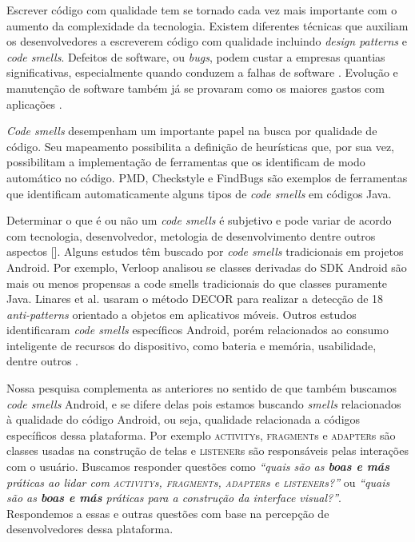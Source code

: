 Escrever c\'odigo com qualidade tem se tornado cada vez mais importante com o aumento da complexidade da tecnologia. Existem diferentes t\'ecnicas que auxiliam os desenvolvedores a escreverem c\'odigo com qualidade incluindo \textit{design patterns} e \textit{code smells}. Defeitos de software, ou \textit{bugs}, podem custar a empresas quantias significativas, especialmente quando conduzem a falhas de software \cite{Nagappan:2005, briand1993modeling}. Evolu\c{c}\~ao e manuten\c{c}\~ao de software tamb\'em j\'a se provaram como os maiores gastos com aplica\c{c}\~oes \cite{RefactoringAndImprovements:10}.

\textit{Code smells} desempenham um importante papel na busca por qualidade de c\'odigo. Seu mapeamento possibilita a defini\c{c}\~ao de heur\'isticas que, por sua vez, possibilitam a implementa\c{c}\~ao de ferramentas que os identificam de modo autom\'atico no c\'odigo. PMD, Checkstyle e FindBugs s\~ao exemplos de ferramentas que identificam automaticamente alguns tipos de \textit{code smells} em c\'odigos Java.

Determinar o que \'e ou n\~ao um \textit{code smells} \'e subjetivo e pode variar de acordo com tecnologia, desenvolvedor, metologia de desenvolvimento dentre outros aspectos []. Alguns estudos t\^em buscado por \textit{code smells} tradicionais em projetos Android. Por exemplo, Verloop \cite{MobileSmells:13} analisou se classes derivadas do SDK Android s\~ao mais ou menos propensas a code smells tradicionais do que classes puramente Java. Linares et al. \cite{DomainMatters} usaram o m\'etodo DECOR para realizar a detec\c{c}\~ao de 18 \textit{anti-patterns} orientado a objetos em aplicativos m\'oveis. Outros estudos identificaram \textit{code smells} espec\'ificos Android, por\'em relacionados ao consumo inteligente de recursos do dispositivo, como bateria e mem\'oria, usabilidade, dentre outros \cite{EnergyAndroidSmells, ReimannBrylski2013}. 

Nossa pesquisa complementa as anteriores no sentido de que tamb\'em buscamos \textit{code smells} Android, e se difere delas pois estamos buscando \textit{smells} relacionados \`a qualidade do c\'odigo Android, ou seja, qualidade relacionada a c\'odigos espec\'ificos dessa plataforma. Por exemplo \textsc{activity}s, \textsc{fragment}s e \textsc{adapter}s s\~ao classes usadas na constru\c{c}\~ao de telas e \textsc{listener}s s\~ao respons\'aveis pelas intera\c{c}\~oes com o usu\'ario. Buscamos responder quest\~oes como \textit{``quais s\~ao as \textbf{boas e m\'as} pr\'aticas ao lidar com \textsc{activity}s, \textsc{fragment}s, \textsc{adapter}s e \textsc{listener}s?''} ou \textit{``quais s\~ao as \textbf{boas e m\'as} pr\'aticas para a constru\c{c}\~ao da interface visual?''}. Respondemos a essas e outras quest\~oes com base na percep\c{c}\~ao de desenvolvedores dessa plataforma. 

